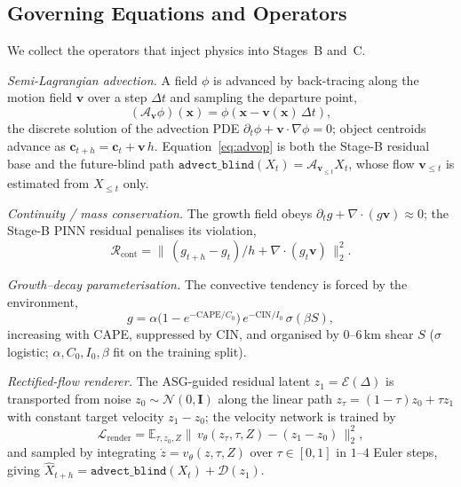 \documentclass[fleqn,10pt]{wlscirep}
\begin{document}
\subsection*{Governing Equations and Operators}

We collect the operators that inject physics into Stages~B and~C.

\emph{Semi-Lagrangian advection.} A field $\phi$ is advanced by back-tracing along the motion field $\mathbf{v}$ over a step $\Delta t$ and sampling the departure point,
\begin{equation}
(\mathcal{A}_{\mathbf{v}}\phi)(\mathbf{x}) = \phi\!\left(\mathbf{x} - \mathbf{v}(\mathbf{x})\,\Delta t\right),
\label{eq:advop}
\end{equation}
the discrete solution of the advection PDE $\partial_t\phi + \mathbf{v}\!\cdot\!\nabla\phi = 0$; object centroids advance as $\mathbf{c}_{t+h}=\mathbf{c}_t+\mathbf{v}\,h$. Equation~\ref{eq:advop} is both the Stage-B residual base and the future-blind path $\texttt{advect\_blind}(X_t)=\mathcal{A}_{\mathbf{v}_{\le t}}X_t$, whose flow $\mathbf{v}_{\le t}$ is estimated from $X_{\le t}$ only.

\emph{Continuity / mass conservation.} The growth field obeys $\partial_t g + \nabla\!\cdot\!(g\mathbf{v})\approx 0$; the Stage-B PINN residual penalises its violation,
\begin{equation}
\mathcal{R}_\text{cont} = \big\|\,(g_{t+h}-g_t)/h + \nabla\!\cdot\!(g_t\mathbf{v})\,\big\|_2^2 .
\label{eq:cont}
\end{equation}

\emph{Growth--decay parameterisation.} The convective tendency is forced by the environment,
\begin{equation}
g = \alpha\big(1-e^{-\mathrm{CAPE}/C_0}\big)\,e^{-\mathrm{CIN}/I_0}\,\sigma(\beta S),
\label{eq:growth}
\end{equation}
increasing with CAPE, suppressed by CIN, and organised by $0$--$6$\,km shear $S$ ($\sigma$ logistic; $\alpha,C_0,I_0,\beta$ fit on the training split).

\emph{Rectified-flow renderer.} The ASG-guided residual latent $z_1=\mathcal{E}(\Delta)$ is transported from noise $z_0\sim\mathcal{N}(0,\mathbf{I})$ along the linear path $z_\tau=(1-\tau)z_0+\tau z_1$ with constant target velocity $z_1-z_0$; the velocity network is trained by
\begin{equation}
\mathcal{L}_\text{render} = \mathbb{E}_{\tau,z_0,Z}\big\|\,v_\theta(z_\tau,\tau,Z) - (z_1-z_0)\,\big\|_2^2 ,
\label{eq:rf}
\end{equation}
and sampled by integrating $\dot z = v_\theta(z,\tau,Z)$ over $\tau\in[0,1]$ in $1$--$4$ Euler steps, giving $\hat{X}_{t+h}=\texttt{advect\_blind}(X_t)+\mathcal{D}(z_1)$.
\end{document}
